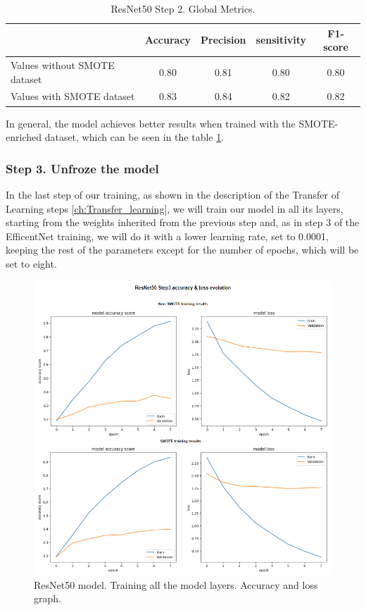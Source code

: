 \begin{table}[ht]
\centering
\begin{tabular}{lcccc}
\cline{2-5}
 & \textbf{Accuracy} & \textbf{Precision} & \textbf{sensitivity} & \textbf{F1-score} \\ \hline
Values without SMOTE dataset & 0.80 & 0.81 & 0.80 & 0.80 \\ \hline
Values with SMOTE dataset & 0.83 & 0.84 & 0.82 & 0.82 \\ \hline
\end{tabular}
    \caption{ResNet50 Step 2. Global Metrics.}
    \label{tbl: Model_RNet50_2_global_values}
\end{table}

In general, the model achieves better results when trained with the SMOTE-enriched dataset, which can be seen in the table \ref{tbl: Model_RNet50_2_global_values}. 


\subsubsection{Step 3. Unfroze the model}
In the last step of our training, as shown in the description of the Transfer of Learning steps \ref{ch:Transfer_learning}, we will train our model in all its layers, starting from the weights inherited from the previous step and, as in step 3 of the EfficentNet training, we will do it with a lower learning rate, set to 0.0001, keeping the rest of the parameters except for the number of epochs, which will be set to eight.

\begin{figure}[ht]
    \begin{center}
        \includegraphics[scale=0.5]{images/Building/Model RestNet50/model_RNet_3_model accuray-loss.png}
        \caption{ResNet50 model. Training all the model layers. Accuracy and loss graph.}
    \label{fig: ResNet50_3_accuracy_loss}    
    \end{center}
\end{figure}

